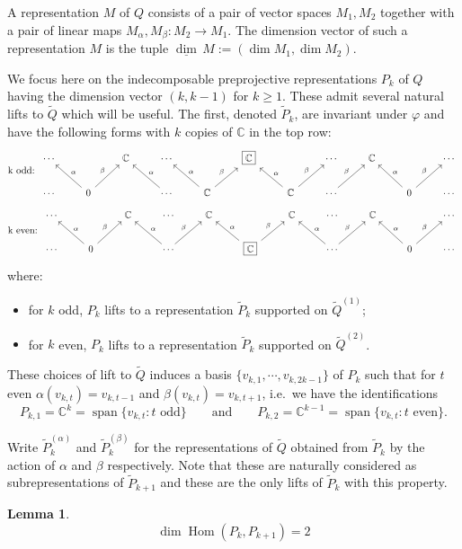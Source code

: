 \documentclass{amsart}
\newtheorem{lemma}[theorem]{Lemma}
\numberwithin{equation}{section}
\newcommand{\CC}{\mathbb{C}}
\newcommand{\Hom}{\operatorname{Hom}}
\newcommand{\Span}{\operatorname{span}}
\newcommand{\udim}{\underline{\dim}\,}
\begin{document}
  A representation $M$ of $Q$ consists of a pair of vector spaces $M_1,M_2$ together with a pair of linear maps $M_\alpha,M_\beta:M_2\to M_1$.
  The dimension vector of such a representation $M$ is the tuple $\udim M:=(\dim M_1,\dim M_2)$.

  We focus here on the indecomposable preprojective representations $P_k$ of $Q$ having the dimension vector $(k,k-1)$ for $k\ge1$.
  These admit several natural lifts to $\widetilde Q$ which will be useful.
  The first, denoted $\widetilde P_k$, are invariant under $\varphi$ and have the following forms with $k$ copies of $\CC$ in the top row:
  \[
    \text{k odd: }
    \begin{tikzcd}
      \cdots & & \CC & \cdots & & \fbox{$\CC$} & & \cdots & \CC & & \cdots \\
      \cdots & 0 \arrow["\alpha"']{ul} \arrow["\beta"]{ur} & & \cdots \arrow["\alpha"']{ul} & \CC \arrow["\alpha"']{ul} \arrow["\beta"]{ur} & & \CC \arrow["\alpha"']{ul} \arrow["\beta"]{ur} & \cdots \arrow["\beta"]{ur} & & 0 \arrow["\alpha"']{ul} \arrow["\beta"]{ur} & \cdots
    \end{tikzcd}
  \]
  \[
    \text{k even: }
    \begin{tikzcd}
      \cdots & & \CC & \cdots & \CC & & \CC & \cdots & \CC & & \cdots \\
      \cdots & 0 \arrow["\alpha"']{ul} \arrow["\beta"]{ur} & & \cdots \arrow["\alpha"']{ul} \arrow["\beta"]{ur} & & \fbox{$\CC$} \arrow["\alpha"']{ul} \arrow["\beta"]{ur} & & \cdots \arrow["\alpha"']{ul} \arrow["\beta"]{ur} & & 0 \arrow["\alpha"']{ul} \arrow["\beta"]{ur} & \cdots
    \end{tikzcd}
  \]
  where:
  \begin{itemize}
    \item for $k$ odd, $P_k$ lifts to a representation $\widetilde P_k$ supported on $\widetilde Q^{(1)}$;
    \item for $k$ even, $P_k$ lifts to a representation $\widetilde P_k$ supported on $\widetilde Q^{(2)}$.
  \end{itemize}

  These choices of lift to $\widetilde Q$ induces a basis $\{v_{k,1},\cdots,v_{k,2k-1}\}$ of $P_k$ such that for $t$ even $\alpha(v_{k,t})=v_{k,t-1}$ and $\beta(v_{k,t})=v_{k,t+1}$, i.e.\ we have the identifications
  \[P_{k,1}=\CC^k=\Span\{v_{k,t}:\text{$t$ odd}\}\qquad\text{and}\qquad P_{k,2}=\CC^{k-1}=\Span\{v_{k,t}:\text{$t$ even}\}.\]

  Write $\widetilde P_k^{(\alpha)}$ and $\widetilde P_k^{(\beta)}$ for the representations of $\widetilde Q$ obtained from $\widetilde P_k$ by the action of $\alpha$ and $\beta$ respectively.
  Note that these are naturally considered as subrepresentations of $\widetilde P_{k+1}$ and these are the only lifts of $\widetilde P_k$ with this property.
  \begin{lemma}
    \[\dim\Hom(P_k,P_{k+1})=2\]
  \end{lemma}
\end{document}
